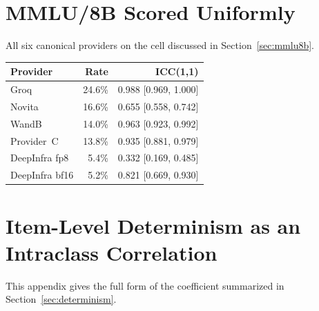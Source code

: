 \documentclass[11pt]{article}
\begin{document}
\section{MMLU/8B Scored Uniformly}
\label{app:mmlu8b}

All six canonical providers on the cell discussed in
Section~\ref{sec:mmlu8b}.

\begin{center}
\small
\begin{tabular}{lrr}
\toprule
\textbf{Provider} & \textbf{Rate} & \textbf{ICC(1,1)} \\
\midrule
Groq            & 24.6\% & 0.988 [0.969, 1.000] \\
Novita          & 16.6\% & 0.655 [0.558, 0.742] \\
WandB           & 14.0\% & 0.963 [0.923, 0.992] \\
Provider~C      & 13.8\% & 0.935 [0.881, 0.979] \\
DeepInfra fp8   &  5.4\% & 0.332 [0.169, 0.485] \\
DeepInfra bf16  &  5.2\% & 0.821 [0.669, 0.930] \\
\bottomrule
\end{tabular}
\label{tab:mmlu8b}
\end{center}

\section{Item-Level Determinism as an Intraclass Correlation}
\label{app:icc}

This appendix gives the full form of the coefficient summarized in
Section~\ref{sec:determinism}.
\end{document}
